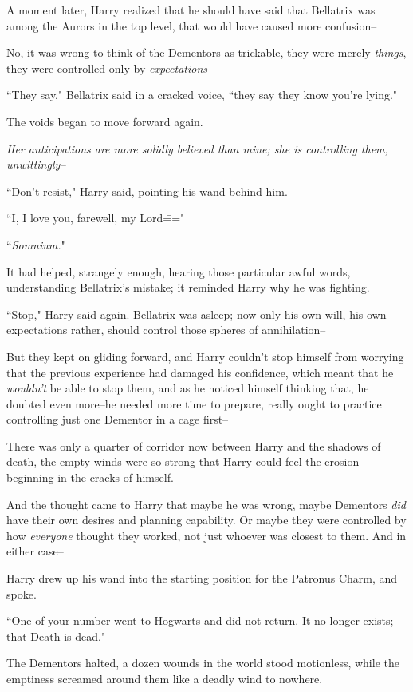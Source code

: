 A moment later, Harry realized that he should have said that Bellatrix was among the Aurors in the top level, that would have caused more confusion\---

No, it was wrong to think of the Dementors as trickable, they were merely \emph{things}, they were controlled only by \emph{expectations\---}

``They say," Bellatrix said in a cracked voice, ``they say they know you're lying."

The voids began to move forward again.

\emph{Her anticipations are more solidly believed than mine; she is controlling them, unwittingly\---}

``Don't resist," Harry said, pointing his wand behind him.

``I, I love you, farewell, my Lord\==="

``\emph{Somnium.}"

It had helped, strangely enough, hearing those particular awful words, understanding Bellatrix's mistake; it reminded Harry why he was fighting.

``Stop," Harry said again. Bellatrix was asleep; now only his own will, his own expectations rather, should control those spheres of annihilation\---

But they kept on gliding forward, and Harry couldn't stop himself from worrying that the previous experience had damaged his confidence, which meant that he \emph{wouldn't} be able to stop them, and as he noticed himself thinking that, he doubted even more\---he needed more time to prepare, really ought to practice controlling just one Dementor in a cage first\---

There was only a quarter of corridor now between Harry and the shadows of death, the empty winds were so strong that Harry could feel the erosion beginning in the cracks of himself.

And the thought came to Harry that maybe he was wrong, maybe Dementors \emph{did} have their own desires and planning capability. Or maybe they were controlled by how \emph{everyone} thought they worked, not just whoever was closest to them. And in either case\---

Harry drew up his wand into the starting position for the Patronus Charm, and spoke.

``One of your number went to Hogwarts and did not return. It no longer exists; that Death is dead."

The Dementors halted, a dozen wounds in the world stood motionless, while the emptiness screamed around them like a deadly wind to nowhere.

